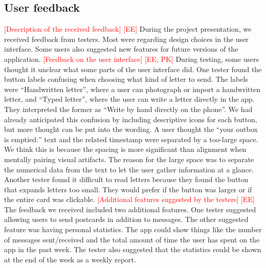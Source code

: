 \documentclass[acmlarge, review=false, screen=true]{acmart}
\begin{document}
    \subsection{User feedback}
      \textcolor{red}{[Description of the received feedback] [EE]} \newline
      During the project presentation, we received feedback from testers. Most were regarding design choices in the user interface. Some users also suggested new features for future versions of the application.
\newline\newline
      \textcolor{red}{[Feedback on the user interface] [EE, PK]} \newline
      During testing, some users thought it unclear what some parts of the user interface did. One tester found the button labels confusing when choosing what kind of letter to send. The labels were “Handwritten letter”, where a user can photograph or import a handwritten letter, and “Typed letter”, where the user can write a letter directly in the app. They interpreted the former as “Write by hand directly on the phone”. We had already anticipated this confusion by including descriptive icons for each button, but more thought can be put into the wording. A user thought the “your outbox is emptied:” text and the related timestamp were separated by a too-large space. We think this is because the spacing is more significant than alignment when mentally pairing visual artifacts\cite{lecturenotes-interaktion}. The reason for the large space was to separate the numerical data from the text to let the user gather information at a glance.
      Another tester found it difficult to read letters because they found the button that expands letters too small. They would prefer if the button was larger or if the entire card was clickable.
\newline\newline
      \textcolor{red}{[Additional features suggested by the testers] [EE]} \newline
      The feedback we received included two additional features. One tester suggested allowing users to send postcards in addition to messages. The other suggested feature was having personal statistics. The app could show things like the number of messages sent/received and the total amount of time the user has spent on the app in the past week. The tester also suggested that the statistics could be shown at the end of the week as a weekly report.
\end{document}
